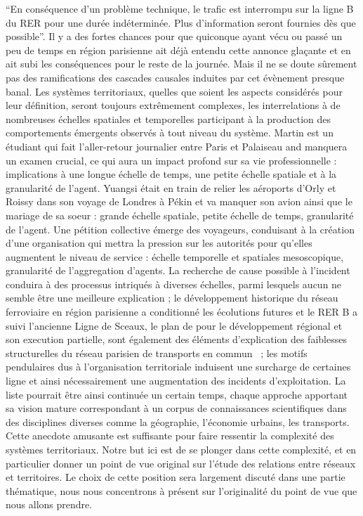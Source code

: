 {}{
``En conséquence d'un problème technique, le trafic est interrompu sur la ligne B du RER pour une durée indéterminée. Plus d'information seront fournies dès que possible''. Il y a des fortes chances pour que quiconque ayant vécu ou passé un peu de temps en région parisienne ait déjà entendu cette annonce glaçante et en ait subi les conséquences pour le reste de la journée. Mais il ne se doute sûrement pas des ramifications des cascades causales induites par cet évènement presque banal. Les systèmes territoriaux, quelles que soient les aspects considérés pour leur définition, seront toujours extrêmement complexes, les interrelations à de nombreuses échelles spatiales et temporelles participant à la production des comportements émergents observés à tout niveau du système. Martin est un étudiant qui fait l'aller-retour journalier entre Paris et Palaiseau and manquera un examen crucial, ce qui aura un impact profond sur sa vie professionnelle : implications à une longue échelle de temps, une petite échelle spatiale et à la granularité de l'agent.
 Yuangsi était en train de relier les aéroports d'Orly et Roissy dans son voyage de Londres à Pékin et va manquer son avion ainsi que le mariage de sa soeur : grande échelle spatiale, petite échelle de temps, granularité de l'agent. Une pétition collective émerge des voyageurs, conduisant à la création d'une organisation qui mettra la pression sur les autorités pour qu'elles augmentent le niveau de service : échelle temporelle et spatiales mesoscopique, granularité de l'aggregation d'agents. La recherche de cause possible à l'incident conduira à des processus intriqués à diverses échelles, parmi lesquels aucun ne semble être une meilleure explication ; le développement historique du réseau ferroviaire en région parisienne a conditionné les écolutions futures et le RER B a suivi l'ancienne Ligne de Sceaux, le plan de  pour le développement régional et son execution partielle, sont également des éléments d'explication des faiblesses structurelles du réseau parisien de transports en commun~\cite{gleyze2005vulnerabilite}  
; les motifs pendulaires dus à l'organisation territoriale induisent une surcharge de certaines ligne et ainsi nécessairement une augmentation des incidents d'exploitation. La liste pourrait être ainsi continuée un certain temps, chaque approche apportant sa vision mature correspondant à un corpus de connaissances scientifiques dans des disciplines diverses comme la géographie, l'économie urbains, les transports. Cette anecdote amusante est suffisante pour faire ressentir la complexité des systèmes territoriaux. Notre but ici est de se plonger dans cette complexité, et en particulier donner un point de vue original sur l'étude des relations entre réseaux et territoires. Le choix de cette position sera largement discuté dans une partie thématique, nous nous concentrons à présent sur l'originalité du point de vue que nous allons prendre.
}






